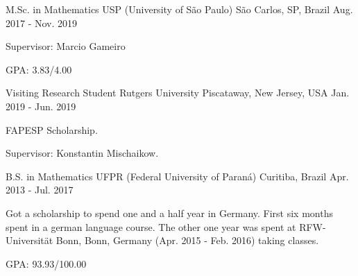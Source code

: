 

\begin{cventries}

  \cventry
    {M.Sc. in Mathematics} %
    {USP (University of São Paulo)} %
    {São Carlos, SP, Brazil} %
    {Aug. 2017 - Nov. 2019}
    {
      \begin{cvitems} %
        \item{Supervisor: Marcio Gameiro}
        \item{GPA: 3.83/4.00}
      \end{cvitems}
    }

  \cventry
    {Visiting Research Student}
    {Rutgers University}
    {Piscataway, New Jersey, USA}
    {Jan. 2019 - Jun. 2019}
    {
      \begin{cvitems}
        \item{FAPESP Scholarship.}
        \item{Supervisor: Konstantin Mischaikow.}
      \end{cvitems}
    }

  \cventry
    {B.S. in Mathematics} %
    {UFPR (Federal University of Paraná)} %
    {Curitiba, Brazil} %
    {Apr. 2013 - Jul. 2017} %
    {
      \begin{cvitems} %
        \item{Got a scholarship to spend one and a half year in Germany.
              First six months spent in a german language course.
              The other one year was spent at RFW-Universität Bonn, Bonn, Germany
              (Apr. 2015 - Feb. 2016) taking classes.}
        \item{GPA: 93.93/100.00}
      \end{cvitems}
    }

\end{cventries}
